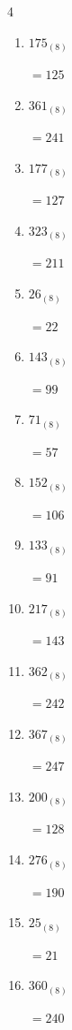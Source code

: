 \begin{multicols}{4}
\begin{enumerate}
        $=121$

  \item $175_{(8)}$

        $=125$

  \item $361_{(8)}$

        $=241$

  \item $177_{(8)}$

        $=127$

  \item $323_{(8)}$

        $=211$

  \item $26_{(8)}$

        $=22$

  \item $143_{(8)}$

        $=99$

  \item $71_{(8)}$

        $=57$

  \item $152_{(8)}$

        $=106$

  \item $133_{(8)}$

        $=91$

  \item $217_{(8)}$

        $=143$

  \item $362_{(8)}$

        $=242$

  \item $367_{(8)}$

        $=247$

  \item $200_{(8)}$

        $=128$

  \item $276_{(8)}$

        $=190$

\columnbreak %

  \item $25_{(8)}$

        $=21$

  \item $360_{(8)}$

        $=240$


\end{enumerate}
\end{multicols}
